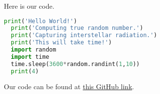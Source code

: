 Here is our code.

\begin{lstlisting}[language=python, showstringspaces=false,frame=single]
  print('Hello World!')
  print('Computing true random number.')
  print('Capturing interstellar radiation.')
  print('This will take time!')
  import random
  import time
  time.sleep(3600*random.randint(1,10))
  print(4)
\end{lstlisting}

Our code can be found at \href{https://github.com/habib-university/Kaavish-Template}{this GitHub link}.

